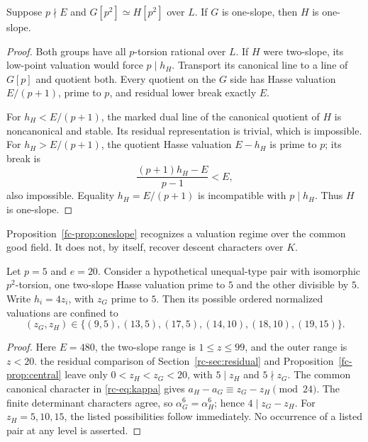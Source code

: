 \begin{proposition}\label{fc-prop:oneslope}
Suppose \(p\nmid E\) and \(G[p^2]\simeq H[p^2]\) over \(L\). If \(G\)
is one-slope, then \(H\) is one-slope.
\end{proposition}
\begin{proof}
Both groups have all \(p\)-torsion rational over \(L\). If \(H\) were
two-slope, its low-point valuation would force \(p\mid h_H\).
Transport its canonical line to a line of \(G[p]\) and quotient both.
Every quotient on the \(G\) side has Hasse valuation \(E/(p+1)\), prime
to \(p\), and residual lower break exactly \(E\).

For \(h_H<E/(p+1)\), the marked dual line of the canonical quotient of
\(H\) is noncanonical and stable. Its residual representation is trivial,
which is impossible. For \(h_H>E/(p+1)\), the quotient Hasse valuation
\(E-h_H\) is prime to \(p\); its break is
\[
 \frac{(p+1)h_H-E}{p-1}<E,
\]
also impossible. Equality \(h_H=E/(p+1)\) is incompatible with
\(p\mid h_H\). Thus \(H\) is one-slope.
\end{proof}

\begin{remark}
Proposition~\ref{fc-prop:oneslope} recognizes a valuation regime over the
common good field. It does not, by itself, recover descent characters
over \(K\).
\end{remark}

\begin{corollary}\label{fc-cor:six}
Let \(p=5\) and \(e=20\). Consider a hypothetical unequal-type pair with
isomorphic \(p^2\)-torsion, one two-slope Hasse valuation prime to \(5\) and
the other divisible by \(5\). Write \(h_i=4z_i\), with \(z_G\) prime to \(5\).
Then its possible ordered normalized valuations are confined to
\[
 (z_G,z_H)\in
 \{(9,5),(13,5),(17,5),(14,10),(18,10),(19,15)\}.
\]
\end{corollary}
\begin{proof}
Here \(E=480\), the two-slope range is \(1\leq z\leq99\), and the
outer range is \(z<20\). the residual comparison of Section~\ref{rc-sec:residual} and
Proposition~\ref{fc-prop:central} leave only
\(0<z_H<z_G<20\), with \(5\mid z_H\) and \(5\nmid z_G\).
The common canonical character in \eqref{rc-eq:kappa} gives
\(a_H-a_G\equiv z_G-z_H\pmod{24}\).
The finite determinant characters agree, so
\(\alpha_G^6=\alpha_H^6\); hence \(4\mid z_G-z_H\).
For \(z_H=5,10,15\), the listed possibilities follow immediately.
No occurrence of a listed pair at any level is asserted.
\end{proof}

